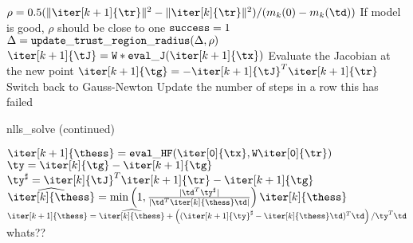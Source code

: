 \begin{algorithm}
\begin{algorithmic}[1]
        \State $\rho = 0.5 (\| \iter[k+1]{\tr} \|^2 - \| \iter[k]{\tr}\|^2)/(m_k(0) - m_k(\td)) $ 
        \Comment If model is good, $\rho$ should be close to one
          \State ${\tt success} = 1$
        \EndIf
        \State $\Delta = {\tt update\_trust\_region\_radius}(\Delta,\rho)$
      \EndWhile
      \State $\iter[k+1]{\tJ} = {\tt W * eval\_J}(\iter[k+1]{\tx})$
      \Comment Evaluate the Jacobian at the new point
      \State $\iter[k+1]{\tg} = -{\iter[k+1]{\tJ}}^T\iter[k+1]{\tr}$
          \If { $\|\iter[k+1]{\tJ}\| > \|\iter[k]{\tJ} \| $}
          \Comment Switch back to Gauss-Newton
          \EndIf
        \Else
          \Comment Update the number of steps in a row this has failed
          \EndIf
          \EndIf
        \EndIf
      \EndIf
  \end{algorithmic}
  
\end{algorithm}

\begin{algorithm}
\caption{nlls\_solve (continued)}
  \ContinuedFloat
  \begin{algorithmic}
        \State $\iter[k+1]{\thess} = {\tt eval\_HF(\iter[0]{\tx},W\iter[0]{\tr})}$
      \Else
        \State $\ty = \iter[k]{\tg} - \iter[k+1]{\tg}$
        \State $\ty^\sharp = {\iter[k]{\tJ}}^T \iter[k+1]{\tr} - \iter[k+1]{\tg}$
        \State $\widehat{\iter[k]{\thess}} = \min\left( 1, \frac{|\td^T\ty^\sharp|}{|\td^T\iter[k]{\thess}\td|}\right) \iter[k]{\thess}$
        \State $\iter[k+1]{\thess} = \widehat{\iter[k]{\thess}} + 
        \left(({\iter[k+1]{\ty}}^\sharp - \iter[k]{\thess}\td 
          )^T\td\right)/\ty^T\td$
      \EndIf
    \State whats??
    \EndIf
    \EndFor

  \end{algorithmic}
\end{algorithm}




